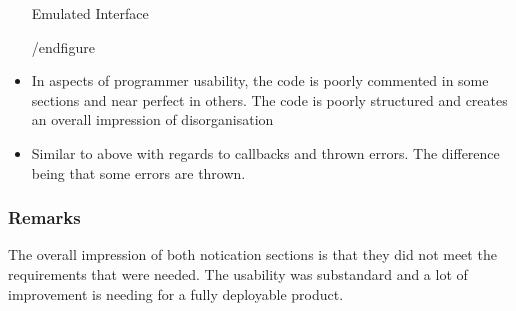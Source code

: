 \begin{itemize}
		\caption{Emulated Interface}
		\label{fig:emuInterface}
	/end{figure}
	\item In aspects of programmer usability, the code is poorly commented in some sections and near perfect in others. The code is poorly structured and creates an overall impression of disorganisation
	\item Similar to above with regards to callbacks and thrown errors. The difference being that some errors are thrown. 
\end{itemize}
\subsubsection{Remarks}
The overall impression of both notication sections is that they did not meet the requirements that were needed. The usability was substandard and a lot of improvement is needing for a fully deployable product.
